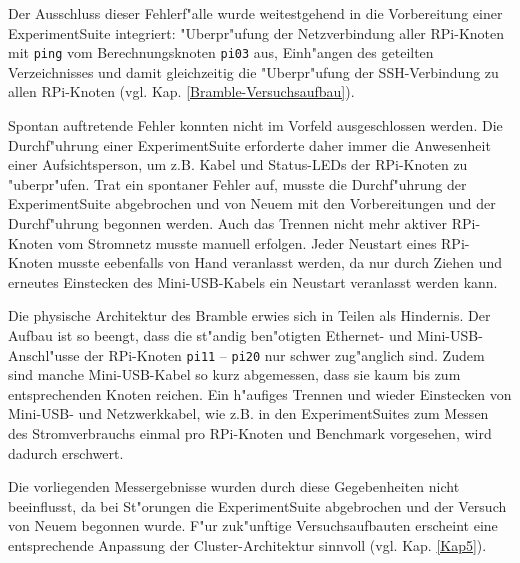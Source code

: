\noindent 
Der Ausschluss dieser Fehlerf"alle wurde weitestgehend in die Vorbereitung einer ExperimentSuite integriert: "Uberpr"ufung der Netzverbindung aller RPi-Knoten mit \texttt{ping} vom Berechnungsknoten \texttt{pi03} aus, Einh"angen des geteilten Verzeichnisses und damit gleichzeitig die  "Uberpr"ufung der SSH-Verbindung zu allen RPi-Knoten (vgl. Kap. \ref{Bramble-Versuchsaufbau}). 

Spontan auftretende Fehler konnten nicht im Vorfeld ausgeschlossen werden. Die Durchf"uhrung einer ExperimentSuite erforderte daher immer die Anwesenheit einer Aufsichtsperson, um z.B. Kabel und Status-LEDs der RPi-Knoten zu "uberpr"ufen. Trat ein spontaner Fehler auf, musste die Durchf"uhrung der ExperimentSuite abgebrochen und von Neuem mit den Vorbereitungen und der Durchf"uhrung begonnen werden. Auch das Trennen nicht mehr aktiver RPi-Knoten vom Stromnetz musste manuell erfolgen. Jeder Neustart eines RPi-Knoten musste eebenfalls von Hand veranlasst werden, da nur durch Ziehen und erneutes Einstecken des Mini-USB-Kabels ein Neustart veranlasst werden kann. 

Die physische Architektur des Bramble erwies sich in Teilen als Hindernis. Der Aufbau ist so beengt, dass die st"andig ben"otigten Ethernet- und Mini-USB-Anschl"usse der RPi-Knoten \texttt{pi11} -- \texttt{pi20} nur schwer zug"anglich sind. Zudem sind manche Mini-USB-Kabel so kurz abgemessen, dass sie kaum bis zum entsprechenden Knoten reichen. Ein h"aufiges Trennen und wieder Einstecken von Mini-USB- und Netzwerkkabel, wie z.B. in den ExperimentSuites zum Messen des Stromverbrauchs einmal pro RPi-Knoten und Benchmark vorgesehen, wird dadurch erschwert. 

Die vorliegenden Messergebnisse wurden durch diese Gegebenheiten nicht beeinflusst, da bei St"orungen die ExperimentSuite abgebrochen und der Versuch von Neuem begonnen wurde. F"ur zuk"unftige Versuchsaufbauten erscheint eine entsprechende Anpassung der Cluster-Architektur sinnvoll (vgl. Kap. \ref{Kap5}).
\endinput 